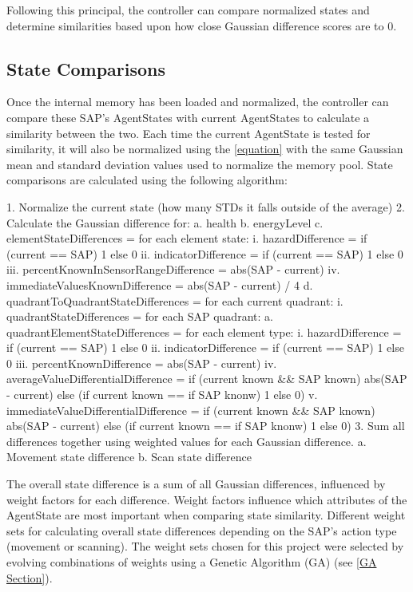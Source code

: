 Following this principal, the controller can compare normalized states and determine similarities based upon how close Gaussian difference scores are to 0.


\subsection{State Comparisons}
Once the internal memory has been loaded and normalized, the controller can compare these SAP's AgentStates with current AgentStates to calculate a similarity between the two.
Each time the current AgentState is tested for similarity, it will also be normalized using the \ref{equation} with the same Gaussian mean and standard deviation values used to normalize the memory pool.
State comparisons are calculated using the following algorithm:

\begin{listings}
1. Normalize the current state (how many STDs it falls outside of the average)
2. Calculate the Gaussian difference for:
  a. health
  b. energyLevel
  c. elementStateDifferences = for each element state:
    i. hazardDifference = if (current == SAP) 1 else 0
    ii. indicatorDifference = if (current == SAP) 1 else 0
    iii. percentKnownInSensorRangeDifference = abs(SAP - current)
    iv. immediateValuesKnownDifference = abs(SAP - current) / 4
  d. quadrantToQuadrantStateDifferences = for each current quadrant:
    i. quadrantStateDifferences = for each SAP quadrant:
      a. quadrantElementStateDifferences = for each element type:
        i. hazardDifference = if (current == SAP) 1 else 0
        ii. indicatorDifference = if (current == SAP) 1 else 0
        iii. percentKnownDifference = abs(SAP - current)
        iv. averageValueDifferentialDifference = if (current known && SAP known) abs(SAP - current) else (if current known == if SAP knonw) 1 else 0)
        v. immediateValueDifferentialDifference = if (current known && SAP known) abs(SAP - current) else (if current known == if SAP knonw) 1 else 0)
3. Sum all differences together using weighted values for each Gaussian difference.
  a. Movement state difference
  b. Scan state difference
\end{listings}

The overall state difference is a sum of all Gaussian differences, influenced by weight factors for each difference.
Weight factors influence which attributes of the AgentState are most important when comparing state similarity.
Different weight sets for calculating overall state differences depending on the SAP's action type (movement or scanning).
The weight sets chosen for this project were selected by evolving combinations of weights using a Genetic Algorithm (GA) (see \ref{GA Section}).

